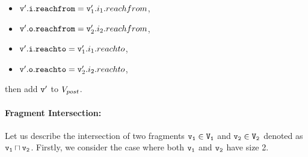 \begin{itemize}
\begin{itemize}
\item $\mathtt{v}'.\mathtt{i}.\mathtt{reachfrom} = \mathtt{v}_1'.i_1.reachfrom$,
\item $\mathtt{v}'.\mathtt{o}.\mathtt{reachfrom} = \mathtt{v}_2'.i_2.reachfrom$,
\item $\mathtt{v}'.\mathtt{i}.\mathtt{reachto} = \mathtt{v}_1'.i_1.reachto$,
\item $\mathtt{v}'.\mathtt{o}.\mathtt{reachto} = \mathtt{v}_2'.i_2.reachto$,
\end{itemize} then add $\mathtt{v}'$ to $V_{post}$. 


\newpage
 \end{itemize}
 
 \paragraph{Fragment Intersection:} Let us describe the intersection of two fragments $\tt \mathtt{v}_1 \in V_1$ and $\tt \mathtt{v}_2 \in V_2$ denoted as $\tt \mathtt{v}_1 \sqcap \mathtt{v}_2$. Firstly, we consider the case where both $\tt \mathtt{v}_1$ and $\tt \mathtt{v}_2$ have size 2.
